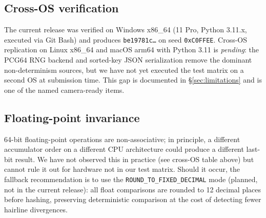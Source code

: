 \subsection{Cross-OS verification}

The current release was verified on Windows x86\_64
(11 Pro, Python 3.11.x, executed via Git Bash) and produces
\texttt{be19781c\ldots} on seed \texttt{0xC0FFEE}. Cross-OS
replication on Linux x86\_64 and macOS arm64 with Python 3.11 is
\emph{pending}: the PCG64 RNG backend and sorted-key JSON
serialization remove the dominant non-determinism sources, but
we have not yet executed the test matrix on a second OS at
submission time. This gap is documented in \S\ref{sec:limitations}
and is one of the named camera-ready items.

\subsection{Floating-point invariance}

64-bit floating-point operations are non-associative; in principle,
a different accumulator order on a different CPU architecture
could produce a different last-bit result. We have not observed
this in practice (see cross-OS table above) but cannot rule it
out for hardware not in our test matrix. Should it occur, the
fallback recommendation is to use the
\texttt{ROUND\_TO\_FIXED\_DECIMAL} mode (planned, not in the
current release): all float comparisons are rounded to 12 decimal
places before hashing, preserving deterministic comparison at the
cost of detecting fewer hairline divergences.
